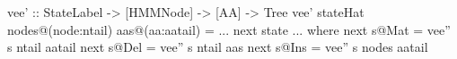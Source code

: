 vee' :: StateLabel -> [HMMNode] -> [AA] -> Tree
vee' stateHat nodes@(node:ntail) aas@(aa:aatail) =
          ... next state ...
  where next s@Mat = vee'' s ntail aatail
        next s@Del = vee'' s ntail aas
        next s@Ins = vee'' s nodes aatail
